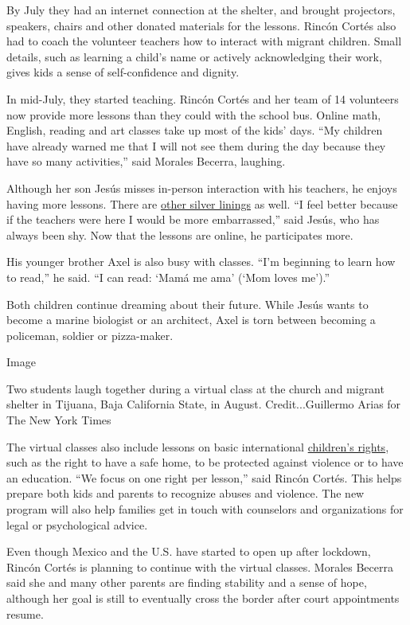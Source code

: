 By July they had an internet connection at the shelter, and brought
projectors, speakers, chairs and other donated materials for the
lessons. Rincón Cortés also had to coach the volunteer teachers how to
interact with migrant children. Small details, such as learning a
child's name or actively acknowledging their work, gives kids a sense of
self-confidence and dignity.

In mid-July, they started teaching. Rincón Cortés and her team of 14
volunteers now provide more lessons than they could with the school bus.
Online math, English, reading and art classes take up most of the kids'
days. ``My children have already warned me that I will not see them
during the day because they have so many activities,'' said Morales
Becerra, laughing.

Although her son Jesús misses in-person interaction with his teachers,
he enjoys having more lessons. There are
\href{https://www.nytimes3xbfgragh.onion/2020/05/20/nyregion/coronavirus-students-schools.html}{other
silver linings} as well. ``I feel better because if the teachers were
here I would be more embarrassed,'' said Jesús, who has always been shy.
Now that the lessons are online, he participates more.

His younger brother Axel is also busy with classes. ``I'm beginning to
learn how to read,'' he said. ``I can read: `Mamá me ama' (`Mom loves
me').''

Both children continue dreaming about their future. While Jesús wants to
become a marine biologist or an architect, Axel is torn between becoming
a policeman, soldier or pizza-maker.

Image

Two students laugh together during a virtual class at the church and
migrant shelter in Tijuana, Baja California State, in August.
Credit...Guillermo Arias for The New York Times

The virtual classes also include lessons on basic international
\href{https://www.unicef.org/child-rights-convention/convention-text-childrens-version}{children's
rights}, such as the right to have a safe home, to be protected against
violence or to have an education. ``We focus on one right per lesson,''
said Rincón Cortés. This helps prepare both kids and parents to
recognize abuses and violence. The new program will also help families
get in touch with counselors and organizations for legal or
psychological advice.

Even though Mexico and the U.S. have started to open up after lockdown,
Rincón Cortés is planning to continue with the virtual classes. Morales
Becerra said she and many other parents are finding stability and a
sense of hope, although her goal is still to eventually cross the border
after court appointments resume.

